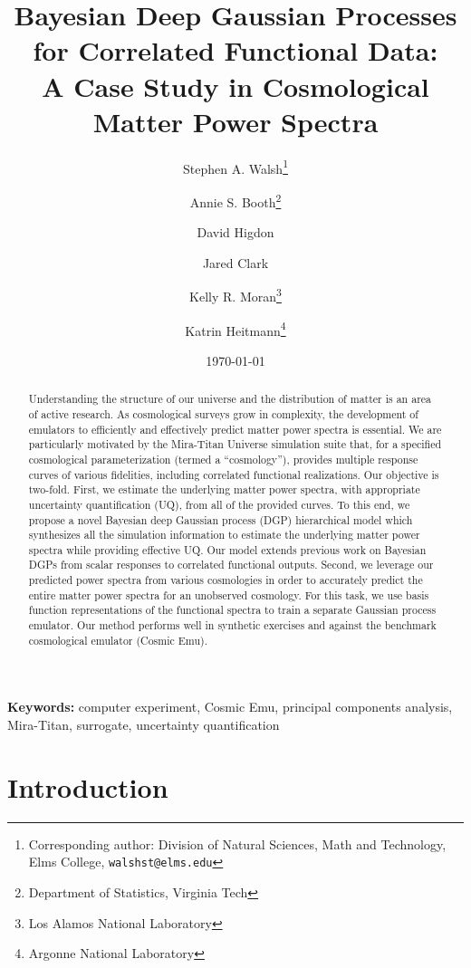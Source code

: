 \documentclass[11pt]{article}
\title{Bayesian Deep Gaussian Processes for Correlated Functional Data: \\
        A Case Study in Cosmological Matter Power Spectra}
\author{Stephen A. Walsh\thanks{Corresponding author: Division of Natural Sciences, 
        Math and Technology, Elms College, {\tt walshst@elms.edu}} \and 
        Annie S. Booth\thanks{Department of Statistics, Virginia Tech} \and
        David Higdon\footnotemark[2] \and
        Jared Clark\footnotemark[2] \and
        Kelly R. Moran\thanks{Los Alamos National Laboratory} \and
        Katrin Heitmann\thanks{Argonne National Laboratory}}
\date{\today}
\begin{document}
\maketitle
\bigskip

\begin{abstract} 
Understanding the structure of our universe and the distribution of matter is an 
area of active research.  As cosmological surveys grow in complexity, the development 
of emulators to efficiently and effectively predict matter power spectra is essential.  
We are particularly motivated by the Mira-Titan Universe simulation
suite that, for a specified cosmological parameterization (termed a ``cosmology''), 
provides multiple response curves of various fidelities, including correlated 
functional realizations.  Our objective is two-fold.  First, we estimate 
the underlying matter power spectra, with appropriate uncertainty 
quantification (UQ), from all of the provided curves.  To this end, we propose a 
novel Bayesian deep Gaussian process (DGP) hierarchical model which synthesizes 
all the simulation information to estimate the underlying matter power spectra
while providing effective UQ.  Our model extends previous work on Bayesian DGPs 
from scalar responses to correlated functional outputs.  Second, we leverage our predicted 
power spectra from various cosmologies in order to accurately predict the entire 
matter power spectra for an 
unobserved cosmology.  For this task, we use basis function representations 
of the functional spectra to train a separate Gaussian process emulator.  
Our method performs well in synthetic exercises and against the benchmark cosmological 
emulator (Cosmic Emu).
\end{abstract}

\noindent \textbf{Keywords:} computer experiment, Cosmic Emu, 
principal components analysis, Mira-Titan, surrogate, uncertainty quantification

\section{Introduction}
\end{document}
